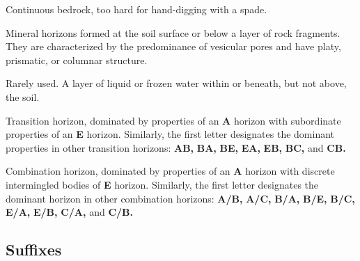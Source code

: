 \documentclass[12pt]{exam}
\begin{document}
\begin{description}[labelsep=2.45em, align=right]
Continuous bedrock, too hard for hand-digging with a spade.
\vspace{0.1in}
\item[V]
Mineral horizons formed at the soil surface or below a layer of rock fragments. They are characterized by the predominance of vesicular pores and have platy, prismatic, or columnar structure.
\vspace{0.1in}
\item[W]
Rarely used. A layer of liquid or frozen water within or beneath, but not above, the soil.
\vspace{0.1in}
\item[AE]
Transition horizon, dominated by properties of an \textbf{A} horizon with subordinate properties of an \textbf{E} horizon. Similarly, the first letter designates the dominant properties in other transition horizons: \textbf{AB,} \textbf{BA,} \textbf{BE,} \textbf{EA,} \textbf{EB,} \textbf{BC,} and \textbf{CB.}
\vspace{0.1in}
\item[A/E]
Combination horizon, dominated by properties of an \textbf{A} horizon with discrete intermingled bodies of \textbf{E} horizon. Similarly, the first letter designates the dominant horizon in other combination horizons: \textbf{A/B,} \textbf{A/C,} \textbf{B/A,} \textbf{B/E,} \textbf{B/C,} \textbf{E/A,} \textbf{E/B,} \textbf{C/A,} and \textbf{C/B.}
\end{description}

\newpage
\begin{center}
    \section*{Suffixes}
\end{center}
    \hrulefill
\end{document}
